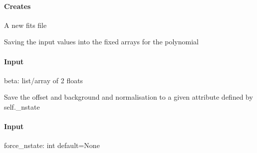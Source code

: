 \documentclass[letterpaper,10pt,english]{sphinxmanual}
\begin{document}
\begin{fulllineitems}
\begin{fulllineitems}
\paragraph{Creates}
\label{\detokenize{api/pymusepipe:id28}}
\sphinxAtStartPar
A new fits file

\end{fulllineitems}


\begin{fulllineitems}
\label{\detokenize{api/pymusepipe:pymusepipe.align_pipe.AlignMuseDataset.save_polypar_ima}}
\pysigstartsignatures
{}
\pysigstopsignatures
\sphinxAtStartPar
Saving the input values into the fixed arrays for the polynomial


\paragraph{Input}
\label{\detokenize{api/pymusepipe:id29}}
\sphinxAtStartPar
beta: list/array of 2 floats

\end{fulllineitems}


\begin{fulllineitems}
\label{\detokenize{api/pymusepipe:pymusepipe.align_pipe.AlignMuseDataset.save_state}}
\pysigstartsignatures
{}
\pysigstopsignatures
\sphinxAtStartPar
Save the offset and background and normalisation to a given attribute
defined by self.\_nstate


\paragraph{Input}
\label{\detokenize{api/pymusepipe:id30}}
\sphinxAtStartPar
force\_nstate: int default=None

\end{fulllineitems}


\end{fulllineitems}
\end{document}
